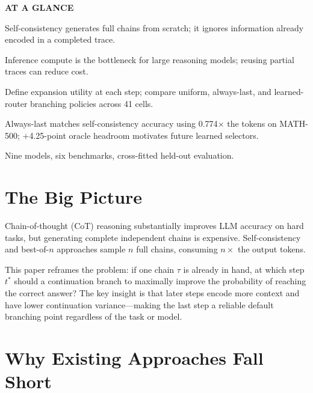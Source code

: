\documentclass[10pt,twocolumn]{article}
\begin{document}
\begin{mdframed}[backgroundcolor=boxgray,linecolor=rulered,linewidth=1pt,
    innerleftmargin=6pt,innerrightmargin=6pt,
    innertopmargin=6pt,innerbottommargin=6pt]
\textbf{\small AT A GLANCE}\par\vspace{4pt}
\begin{description}[leftmargin=0pt,labelsep=4pt,itemsep=2pt,parsep=0pt,
    font=\small\bfseries]
  \item[Problem:] Self-consistency generates full chains from scratch; it
    ignores information already encoded in a completed trace.
  \item[Why it matters:] Inference compute is the bottleneck for large
    reasoning models; reusing partial traces can reduce cost.
  \item[Method:] Define expansion utility at each step; compare uniform,
    always-last, and learned-router branching policies across 41 cells.
  \item[Result:] Always-last matches self-consistency accuracy using
    0.774$\times$ the tokens on MATH-500; $+$4.25-point oracle headroom
    motivates future learned selectors.
  \item[Evidence:] Nine models, six benchmarks, cross-fitted held-out
    evaluation.
\end{description}
\end{mdframed}

\section{The Big Picture}

Chain-of-thought (CoT) reasoning substantially improves LLM accuracy on hard
tasks, but generating complete independent chains is expensive. Self-consistency
and best-of-$n$ approaches sample $n$ full chains, consuming $n\times$ the
output tokens.

This paper reframes the problem: if one chain $\tau$ is already in hand, at which
step $t^*$ should a continuation branch to maximally improve the probability of
reaching the correct answer? The key insight is that later steps encode more
context and have lower continuation variance---making the last step a reliable
default branching point regardless of the task or model.

\section{Why Existing Approaches Fall Short}
\end{document}
